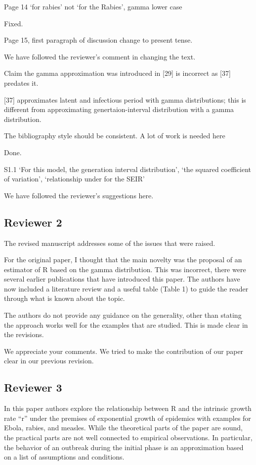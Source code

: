 \documentclass[12pt]{article}
\newcommand{\rev}{\subsection*}
\newcommand{\revtext}{\textsf}
\begin{document}
\revtext{Page 14 ‘for rabies’ not ‘for the Rabies’, gamma lower case}

Fixed.

\revtext{Page 15, first paragraph of discussion change to present tense.}

We have followed the reviewer's comment in changing the text.

\revtext{Claim the gamma approximation was introduced in [29] is incorrect as [37] predates it.}

[37] approximates latent and infectious period with gamma distributions; this is different from approximating genertaion-interval distribution with a gamma distribution.

\revtext{The bibliography style should be consistent. A lot of work is needed here}

Done.

\revtext{S1.1 ‘For this model, the generation interval distribution’, ‘the squared coefficient of variation’, ‘relationship under for the SEIR’}

We have followed the reviewer's suggestions here. 

\rev{Reviewer 2}

\revtext{The revised manuscript addresses some of the issues that were raised.}

\revtext{For the original paper, I thought that the main novelty was the
proposal of an estimator of R based on the gamma distribution. This
was incorrect, there were several earlier publications that have
introduced this paper. The authors have now included a literature
review and a useful table (Table 1) to guide the reader through what
is known about the topic.}

\revtext{The authors do not provide any guidance on the generality, other than
stating the approach works well for the examples that are studied.
This is made clear in the revisions.}

We appreciate your comments. We tried to make the contribution of our paper clear in our previous revision.

\rev{Reviewer 3}

\revtext{In this paper authors explore the relationship between R and the
intrinsic growth rate ``r'' under the premises of exponential growth of
epidemics with examples for Ebola, rabies, and measles. While the
theoretical parts of the paper are sound, the practical parts are not
well connected to empirical observations. In particular, the behavior
of an outbreak during the initial phase is an approximation based on a
list of assumptions and conditions.}
\end{document}
